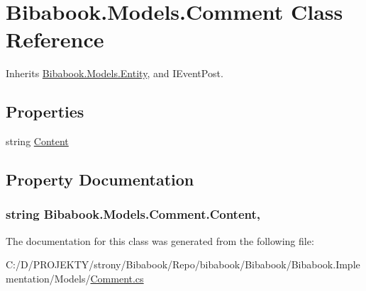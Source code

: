 \hypertarget{class_bibabook_1_1_models_1_1_comment}{}\section{Bibabook.\+Models.\+Comment Class Reference}
\label{class_bibabook_1_1_models_1_1_comment}


Inherits \hyperlink{class_bibabook_1_1_models_1_1_entity}{Bibabook.\+Models.\+Entity}, and I\+Event\+Post.

\subsection*{Properties}
\begin{DoxyCompactItemize}
\item 
string \hyperlink{class_bibabook_1_1_models_1_1_comment_af2559121cc146bd36ab662ded48a6ef9}{Content}
\end{DoxyCompactItemize}


\subsection{Property Documentation}
\hypertarget{class_bibabook_1_1_models_1_1_comment_af2559121cc146bd36ab662ded48a6ef9}{}
\subsubsection[{Content}]{\setlength{\rightskip}{0pt plus 5cm}string Bibabook.\+Models.\+Comment.\+Content\hspace{0.3cm}{\ttfamily [get]}, {\ttfamily [set]}}\label{class_bibabook_1_1_models_1_1_comment_af2559121cc146bd36ab662ded48a6ef9}


The documentation for this class was generated from the following file\+:\begin{DoxyCompactItemize}
\item 
C\+:/\+D/\+P\+R\+O\+J\+E\+K\+T\+Y/strony/\+Bibabook/\+Repo/bibabook/\+Bibabook/\+Bibabook.\+Implementation/\+Models/\hyperlink{_comment_8cs}{Comment.\+cs}\end{DoxyCompactItemize}
